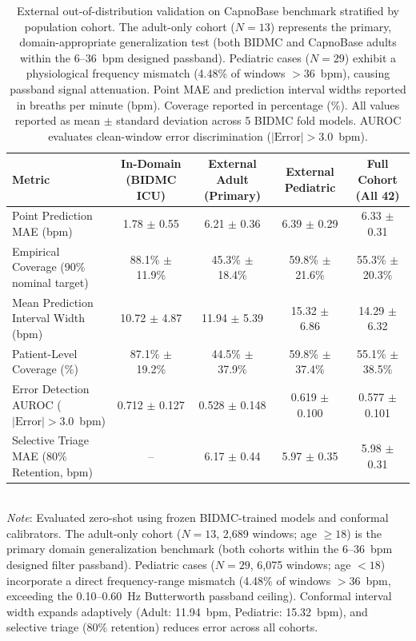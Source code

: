 \begin{table}[htbp]
\centering
\caption{External out-of-distribution validation on CapnoBase benchmark stratified by population cohort. The adult-only cohort ($N=13$) represents the primary, domain-appropriate generalization test (both BIDMC and CapnoBase adults within the 6--36~bpm designed passband). Pediatric cases ($N=29$) exhibit a physiological frequency mismatch (4.48\% of windows $> 36$~bpm), causing passband signal attenuation. Point MAE and prediction interval widths reported in breaths per minute (bpm). Coverage reported in percentage (\%). All values reported as mean $\pm$ standard deviation across 5 BIDMC fold models. AUROC evaluates clean-window error discrimination ($|\text{Error}| > 3.0$~bpm).}
\label{tab:external_validation_capnobase}
\begin{tabular}{lcccc}
\toprule
\textbf{Metric} & \textbf{In-Domain (BIDMC ICU)} & \textbf{External Adult (Primary)} & \textbf{External Pediatric} & \textbf{Full Cohort (All 42)} \\
\midrule
Point Prediction MAE (bpm) & 1.78 $\pm$ 0.55 & 6.21 $\pm$ 0.36 & 6.39 $\pm$ 0.29 & 6.33 $\pm$ 0.31 \\
Empirical Coverage (90\% nominal target) & 88.1\% $\pm$ 11.9\% & 45.3\% $\pm$ 18.4\% & 59.8\% $\pm$ 21.6\% & 55.3\% $\pm$ 20.3\% \\
Mean Prediction Interval Width (bpm) & 10.72 $\pm$ 4.87 & 11.94 $\pm$ 5.39 & 15.32 $\pm$ 6.86 & 14.29 $\pm$ 6.32 \\
Patient-Level Coverage (\%) & 87.1\% $\pm$ 19.2\% & 44.5\% $\pm$ 37.9\% & 59.8\% $\pm$ 37.4\% & 55.1\% $\pm$ 38.5\% \\
Error Detection AUROC ($|\text{Error}| > 3.0$~bpm) & 0.712 $\pm$ 0.127 & 0.528 $\pm$ 0.148 & 0.619 $\pm$ 0.100 & 0.577 $\pm$ 0.101 \\
Selective Triage MAE (80\% Retention, bpm) & -- & 6.17 $\pm$ 0.44 & 5.97 $\pm$ 0.35 & 5.98 $\pm$ 0.31 \\
\bottomrule
\end{tabular}
\vspace{1mm}\\
\footnotesize{\textit{Note}: Evaluated zero-shot using frozen BIDMC-trained models and conformal calibrators. The adult-only cohort ($N=13$, 2,689 windows; age $\ge 18$) is the primary domain generalization benchmark (both cohorts within the 6--36~bpm designed filter passband). Pediatric cases ($N=29$, 6,075 windows; age $< 18$) incorporate a direct frequency-range mismatch (4.48\% of windows $> 36$~bpm, exceeding the 0.10--0.60~Hz Butterworth passband ceiling). Conformal interval width expands adaptively (Adult: 11.94~bpm, Pediatric: 15.32~bpm), and selective triage (80\% retention) reduces error across all cohorts.}\par
\end{table}
